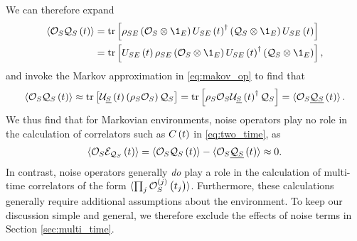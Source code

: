We can therefore expand
\begin{align}
  \bk{\O_S\Q_S\p{t}}
  &= \tr\sp{\rho_{SE} \p{\O_S\otimes\1_E}
    U_{SE}\p{t}^\dag \p{\Q_S\otimes\1_E} U_{SE}\p{t}} \\
  &= \tr\sp{U_{SE}\p{t} \rho_{SE} \p{\O_S\otimes\1_E}
    U_{SE}\p{t}^\dag \p{\Q_S\otimes\1_E}},
\end{align}
and invoke the Markov approximation in \eqref{eq:makov_op} to find
that
\begin{align}
  \braket{\mathcal{O}_S\mathcal{Q}_S\left( t \right)}
  \approx \tr\left[ \mathcal{U}_{\underline S}\left( t \right)\left( \rho_S\mathcal{O}_S \right) \mathcal{Q}_S \right]
  = \tr\left[ \rho_S \mathcal{O}_S \mathcal{U}_{\underline S}\left( t \right)^\dag \mathcal{Q}_S \right]
  = \braket{\mathcal{O}_S\underline{\mathcal{Q}_S}\left( t \right)}.
\end{align}
We thus find that for Markovian environments, noise operators play no
role in the calculation of correlators such as $C\left( t \right)$ in
\eqref{eq:two_time}, as
\begin{align}
  \braket{\mathcal{O}_S\mathcal{E}_{\mathcal{Q}_S}\left( t \right)}
  = \braket{\mathcal{O}_S\mathcal{Q}_S\left( t \right)} - \braket{\mathcal{O}_S\underline{\mathcal{Q}_S}\left( t \right)}
  \approx 0.
\end{align}
In contrast, noise operators generally {\it do} play a role in the
calculation of multi-time correlators of the form
$\braket{\prod_j\mathcal{O}_S^{(j)}\left( t_j \right)}$\cite{blocher2019quantum}.
Furthermore, these calculations generally require additional
assumptions about the environment.  To keep our discussion simple and
general, we therefore exclude the effects of noise terms in Section
\ref{sec:multi_time}.
